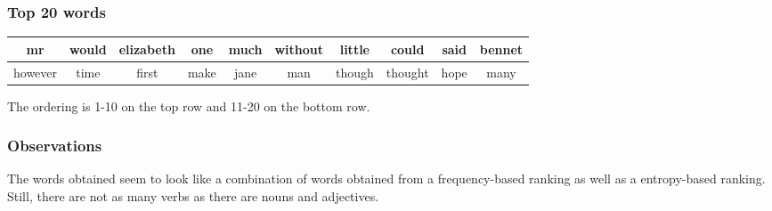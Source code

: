 \documentclass{article}
\begin{document}
\subsubsection{Top 20 words}
\begin{center}
\begin{tabular}{|c|c|c|c|c|c|c|c|c|c|}
\hline
mr & would & elizabeth & one & much & without & little & could & said & bennet\\
\hline
however & time & first & make & jane & man & though & thought & hope & many\\
\hline
\end{tabular}
\end{center}
The ordering is 1-10 on the top row and 11-20 on the bottom row.

\subsubsection{Observations}
The words obtained seem to look like a combination of words obtained from a frequency-based ranking as well as a entropy-based ranking. Still, there are not as many verbs as there are nouns and adjectives.
\end{document}
